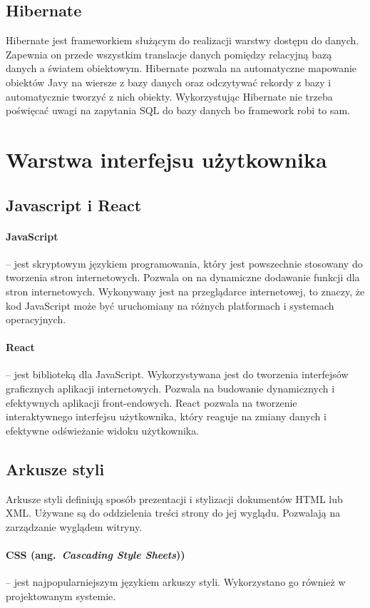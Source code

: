 \subsection{Hibernate}
\label{hibernate:label}
Hibernate jest frameworkiem służącym do realizacji warstwy dostępu do danych. Zapewnia on przede wszystkim translacje danych pomiędzy relacyjną bazą danych a światem obiektowym. Hibernate pozwala na automatyczne mapowanie obiektów Javy na wiersze z bazy danych oraz odczytywać rekordy z bazy i automatycznie tworzyć z nich obiekty. Wykorzystując Hibernate nie trzeba poświęcać uwagi na zapytania SQL do bazy danych bo framework robi to sam.


\section{Warstwa interfejsu użytkownika}

\subsection{Javascript i React}
\paragraph{JavaScript} -- jest skryptowym językiem programowania, który jest powszechnie stosowany do tworzenia stron internetowych. Pozwala on na dynamiczne dodawanie funkcji dla stron internetowych. Wykonywany jest na przeglądarce internetowej, to znaczy, że kod JavaScript może być uruchomiany na różnych platformach i systemach operacyjnych. 

\paragraph{React} -- jest biblioteką dla JavaScript. Wykorzystywana jest do tworzenia interfejsów graficznych aplikacji internetowych. Pozwala na budowanie dynamicznych i efektywnych aplikacji front-endowych. React pozwala na tworzenie interaktywnego interfejsu użytkownika, który reaguje na zmiany danych i efektywne odświeżanie widoku użytkownika.

\subsection{Arkusze styli}
Arkusze styli definiują sposób prezentacji i stylizacji dokumentów HTML lub XML. Używane są do oddzielenia treści strony do jej wyglądu. Pozwalają na zarządzanie wyglądem witryny. 
\paragraph{CSS (ang.~\emph{Cascading Style Sheets}))} -- jest najpopularniejszym językiem arkuszy styli. Wykorzystano go również w projektowanym systemie.

